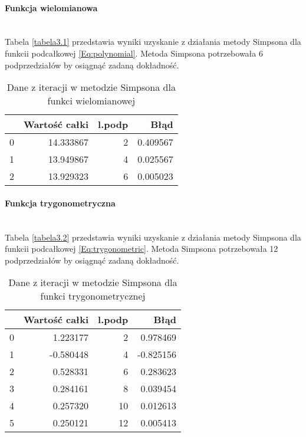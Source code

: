 \documentclass[12pt,twoside]{article}
\begin{document}
\paragraph{Funkcja wielomianowa}\mbox{} \\

Tabela \eqref{tabela3.1} przedstawia wyniki uzyskanie z działania metody Simpsona dla funkcii podcałkowej \eqref{Eq:polynomial}. Metoda Simpsona potrzebowała 6 podprzedziałów by osiągnąć zadaną dokładność.

\begin{table}[H]
\centering 
\caption{Dane z iteracji w metodzie Simpsona dla funkci wielomianowej}
\label{tabela3.1}
\begin{tabular}{lrrr}
\toprule
{} &  Wartość całki &  l.podp &      Błąd \\
\midrule
0 &      14.333867 &       2 &  0.409567 \\
1 &      13.949867 &       4 &  0.025567 \\
2 &      13.929323 &       6 &  0.005023 \\
\bottomrule
\end{tabular}
\end{table}

\paragraph{Funkcja trygonometryczna}\mbox{} \\

Tabela \eqref{tabela3.2} przedstawia wyniki uzyskanie z działania metody Simpsona dla funkcii podcałkowej \eqref{Eq:trygonometric}. Metoda Simpsona potrzebowała 12 podprzedziałów by osiągnąć zadaną dokładność.

\begin{table}[H]
\centering
\caption{Dane z iteracji w metodzie Simpsona dla funkci trygonometrycznej}
\label{tabela3.2}
\begin{tabular}{lrrr}
\toprule
{} &  Wartość całki &  l.podp &      Błąd \\
\midrule
0 &       1.223177 &       2 &  0.978469 \\
1 &      -0.580448 &       4 & -0.825156 \\
2 &       0.528331 &       6 &  0.283623 \\
3 &       0.284161 &       8 &  0.039454 \\
4 &       0.257320 &      10 &  0.012613 \\
5 &       0.250121 &      12 &  0.005413 \\
\bottomrule
\end{tabular}
\end{table}
\end{document}
